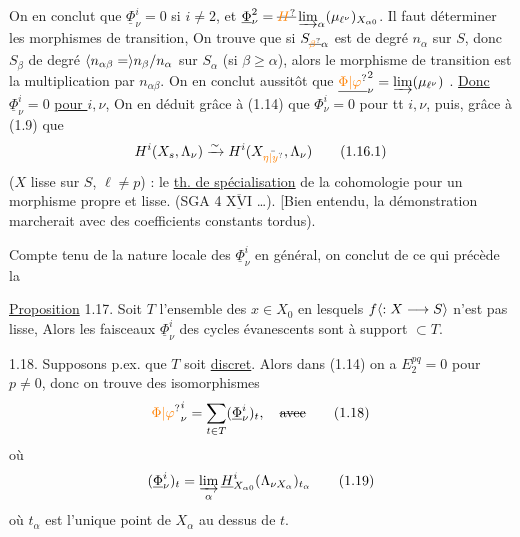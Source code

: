 On en conclut que $\underline\Phi^i_\nu=0$ si $i\ne2$, et $\underline\Phi^2_\nu=\deleted{\unsure{H}}\varinjlim_\alpha(\mu_{\ell^\nu})_{X_{\alpha0}}$. Il faut déterminer les
morphismes de transition,  On trouve que si $S_{\deleted{\unsure{\beta}}\alpha}$ est de degré $n_\alpha$ sur $S$, donc $S_\beta$ de degré $\inserted{n_{\alpha\beta}=}n_\beta/n_\alpha$ sur $S_\alpha$ (si $\beta\geq\alpha$), alors le morphisme de transition est la multiplication par $n_{\alpha\beta}$.  On en conclut aussitôt que $\underline{\unsure{\Phi|\varphi}}^2_\nu=\varinjlim(\mu_{\ell^\nu})$ .  \uline{Donc} $\underline\Phi^i_\nu=0$ \uline{pour  $i,\nu$},   On en déduit grâce à (1.14) que $\Phi^i_\nu=0$ pour tt $i,\nu$, puis, grâce à (1.9) que
\[
H^i(X_s,\Lambda_\nu)\xrightarrow{\sim}H^i(X_{\bar{\unsure{\eta|y}}},\Lambda_\nu)
\tag*{(1.16.1)}
\]
($X$ lisse sur $S$,  $\ell\ne p$) :  le \uline{th. de spécialisation} de la cohomologie pour un morphisme propre et lisse. (SGA 4 $\overline{\underline{\mathrm{XVI}}}$ \dots). [Bien entendu, la  démonstration marcherait avec des coefficients constants tordus).

Compte tenu de la nature locale des $\underline\Phi^i_\nu$ en général, on conclut de ce qui précède la

\uline{Proposition} 1.17. Soit $T$ l'ensemble des $x\in X_0$ en lesquels $f\inserted{:X\longrightarrow S}$ n'est pas lisse,  Alors les faisceaux $\underline\Phi^i_\nu$ des cycles évanescents sont à support $\subset T$.


1.18. Supposons p.ex. que $T$ soit \uline{discret}. Alors dans  (1.14) on a $E_2^{pq}=0$ pour $p\ne0$, donc on trouve des isomorphismes
\[
{\unsure{\Phi|\varphi}}^i_\nu=\sum_{t\in T}(\underline\Phi^i_\nu)_t,\quad\deleted{\text{avec}}
\tag*{(1.18)}
\]
où
\[
(\underline\Phi^i_\nu)_t=\varinjlim_\alpha\underline H^i_{X_{\alpha0}}(\Lambda_{\nu X_\alpha})_{t_\alpha}
\tag*{(1.19)}
\]
où $t_\alpha$ est l'unique point de $X_\alpha$ au dessus de $t$.

